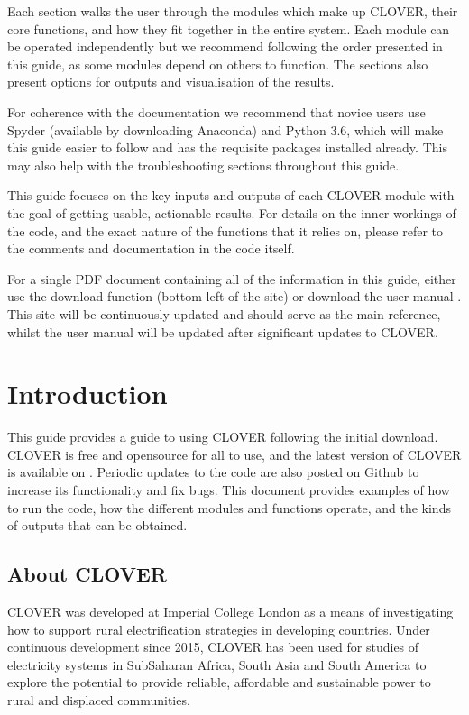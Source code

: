 \documentclass[letterpaper,10pt,english]{sphinxmanual}
\begin{document}
\sphinxAtStartPar
Each section walks the user through the modules which make up CLOVER, their
core functions, and how they fit together in the entire system. Each module
can be operated independently but we recommend following the order presented in
this guide, as some modules depend on others to function. The sections also
present options for outputs and visualisation of the results.

\sphinxAtStartPar
For coherence with the documentation we recommend that novice users use Spyder
(available by downloading Anaconda) and Python 3.6, which will make this guide
easier to follow and has the requisite packages installed already. This may
also help with the troubleshooting sections throughout this guide.

\sphinxAtStartPar
This guide focuses on the key inputs and outputs of each CLOVER module with the
goal of getting usable, actionable results. For details on the inner workings
of the code, and the exact nature of the functions that it relies on, please
refer to the comments and documentation in the code itself.

\sphinxAtStartPar
For a single PDF document containing all of the information in this guide,
either use the download function (bottom left of the site) or download the user
manual .
This site will be continuously updated and should serve as the main reference,
whilst the user manual will be updated after significant updates to CLOVER.


\section{Introduction}
\label{\detokenize{overview:introduction}}\label{\detokenize{overview::doc}}
\sphinxAtStartPar
This guide provides a guide to using CLOVER following the initial
download. CLOVER is free and open\sphinxhyphen{}source for all to use, and the latest
version of CLOVER is available on
. Periodic updates
to the code are also posted on Github to increase its functionality and
fix bugs. This document provides examples of how to run the code, how
the different modules and functions operate, and the kinds of outputs
that can be obtained.


\subsection{About CLOVER}
\label{\detokenize{overview:about-clover}}
\sphinxAtStartPar
CLOVER was developed at Imperial College London as a means of
investigating how to support rural electrification strategies in
developing countries. Under continuous development since 2015, CLOVER
has been used for studies of electricity systems in Sub\sphinxhyphen{}Saharan Africa,
South Asia and South America to explore the potential to provide
reliable, affordable and sustainable power to rural and displaced
communities.
\end{document}
